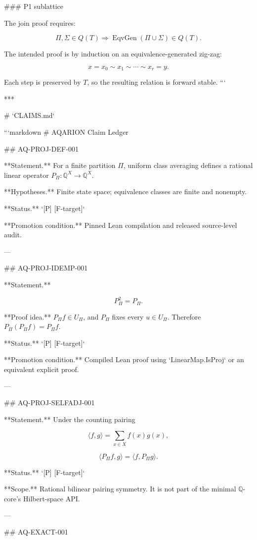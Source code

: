 ### P1 sublattice

The join proof requires:

\[
\Pi,\Sigma\in Q(T)
\Longrightarrow
\operatorname{EqvGen}(\Pi\cup\Sigma)\in Q(T).
\]

The intended proof is by induction on an equivalence-generated zig-zag:

\[
x=x_0\sim x_1\sim\cdots\sim x_r=y.
\]

Each step is preserved by \(T\), so the resulting relation is forward stable.
```

***

# `CLAIMS.md`

```markdown
# AQARION Claim Ledger

## AQ-PROJ-DEF-001

**Statement.** For a finite partition \(\Pi\), uniform class averaging defines
a rational linear operator \(P_\Pi:\mathbb Q^X\to\mathbb Q^X\).

**Hypotheses.** Finite state space; equivalence classes are finite and nonempty.

**Status.** `[P] [F-target]`

**Promotion condition.** Pinned Lean compilation and released source-level audit.

---

## AQ-PROJ-IDEMP-001

**Statement.**

\[
P_\Pi^2=P_\Pi.
\]

**Proof idea.** \(P_\Pi f\in U_\Pi\), and \(P_\Pi\) fixes every
\(u\in U_\Pi\). Therefore \(P_\Pi(P_\Pi f)=P_\Pi f\).

**Status.** `[P] [F-target]`

**Promotion condition.** Compiled Lean proof using `LinearMap.IsProj` or an
equivalent explicit proof.

---

## AQ-PROJ-SELFADJ-001

**Statement.** Under the counting pairing

\[
\langle f,g\rangle
=
\sum_{x\in X}f(x)g(x),
\]

\[
\langle P_\Pi f,g\rangle
=
\langle f,P_\Pi g\rangle.
\]

**Status.** `[P] [F-target]`

**Scope.** Rational bilinear pairing symmetry. It is not part of the minimal
\(\mathbb Q\)-core's Hilbert-space API.

---

## AQ-EXACT-001

